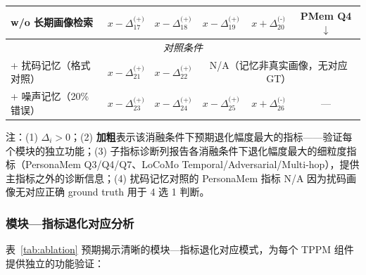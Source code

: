 \documentclass[12pt,a4paper]{article}
\begin{document}
\begin{table}[htbp]
\begin{tabular}{@{}lccccc@{}}
w/o 长期画像检索
  & \textbf{$x-\Delta_{17}^{\text{(+)}}$} & \textbf{$x-\Delta_{18}^{\text{(+)}}$} & \textbf{$x-\Delta_{19}^{\text{(+)}}$} & $x+\Delta_{20}^{\text{(-)}}$ & PMem Q4 $\downarrow$ \\
\midrule
\multicolumn{6}{c}{\textit{对照条件}} \\
\midrule
+ 扰码记忆（格式对照）
  & $x-\Delta_{21}^{\text{(+)}}$ & $x-\Delta_{22}^{\text{(+)}}$ & \multicolumn{3}{c}{N/A（记忆非真实画像，无对应 GT）} \\[4pt]
+ 噪声记忆（20\% 错误）
  & $x-\Delta_{23}^{\text{(+)}}$ & $x-\Delta_{24}^{\text{(+)}}$ & $x-\Delta_{25}^{\text{(+)}}$ & $x+\Delta_{26}^{\text{(-)}}$ & --- \\
\bottomrule
\end{tabular}

\vspace{4pt}
{\footnotesize 注：(1) $\Delta_i>0$；(2) \textbf{加粗}表示该消融条件下预期退化幅度最大的指标——验证每个模块的独立功能；(3) 子指标诊断列报告各消融条件下退化幅度最大的细粒度指标（PersonaMem Q3/Q4/Q7、LoCoMo Temporal/Adversarial/Multi-hop），提供主指标之外的诊断信息；(4) 扰码记忆对照的 PersonaMem 指标 N/A 因为扰码画像无对应正确 ground truth 用于 4 选 1 判断。}
\end{table}

\subsubsection{模块—指标退化对应分析}

表~\ref{tab:ablation} 预期揭示清晰的模块—指标退化对应模式，为每个 TPPM 组件提供独立的功能验证：
\end{document}
